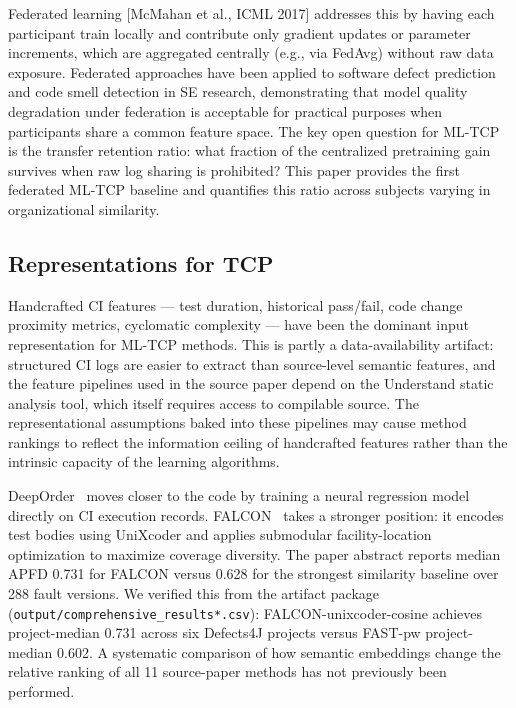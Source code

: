 \documentclass[conference]{IEEEtran}
\begin{document}
Federated learning [McMahan et al., ICML 2017] addresses this by having each participant train locally and contribute only gradient updates or parameter increments, which are aggregated centrally (e.g., via FedAvg) without raw data exposure. Federated approaches have been applied to software defect prediction and code smell detection in SE research, demonstrating that model quality degradation under federation is acceptable for practical purposes when participants share a common feature space. The key open question for ML-TCP is the transfer retention ratio: what fraction of the centralized pretraining gain survives when raw log sharing is prohibited? This paper provides the first federated ML-TCP baseline and quantifies this ratio across subjects varying in organizational similarity.


\subsection{Representations for TCP}

Handcrafted CI features — test duration, historical pass/fail, code change proximity metrics, cyclomatic complexity — have been the dominant input representation for ML-TCP methods. This is partly a data-availability artifact: structured CI logs are easier to extract than source-level semantic features, and the feature pipelines used in the source paper depend on the Understand static analysis tool, which itself requires access to compilable source. The representational assumptions baked into these pipelines may cause method rankings to reflect the information ceiling of handcrafted features rather than the intrinsic capacity of the learning algorithms.


DeepOrder~\cite{deeporder2021} moves closer to the code by training a neural regression model directly on CI execution records. FALCON~\cite{falcon2025} takes a stronger position: it encodes test bodies using UniXcoder and applies submodular facility-location optimization to maximize coverage diversity. The paper abstract reports median APFD 0.731 for FALCON versus 0.628 for the strongest similarity baseline over 288 fault versions. We verified this from the artifact package (\texttt{output/comprehensive\_results*.csv}): FALCON-unixcoder-cosine achieves project-median 0.731 across six Defects4J projects versus FAST-pw project-median 0.602. A systematic comparison of how semantic embeddings change the relative ranking of all 11 source-paper methods has not previously been performed.
\end{document}
